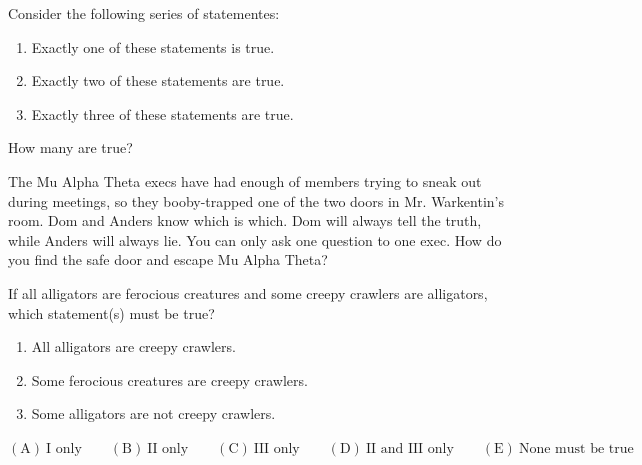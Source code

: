 \documentclass[12pt]{article}
\newenvironment{problem}[2][Problem]{\begin{trivlist}
\item[\hskip \labelsep {\bfseries #1}\hskip \labelsep {\bfseries #2.}]}{\end{trivlist}}
\begin{document}
\begin{problem}{4}
Consider the following series of statementes:
\begin{enumerate}[label=\Roman*.]
  \item Exactly one of these statements is true.
  \item Exactly two of these statements are true.
  \item Exactly three of these statements are true.
\end{enumerate}
How many are true?
\end{problem}
\begin{problem}{5}
The Mu Alpha Theta execs have had enough of members trying to sneak out during meetings, so they booby-trapped one of the two doors in Mr. Warkentin's room. Dom and Anders know which is which. Dom will always tell the truth, while Anders will always lie. You can only ask one question to one exec. How do you find the safe door and escape Mu Alpha Theta?
\end{problem}
\begin{problem}{6}
If all alligators are ferocious creatures and some creepy crawlers are alligators, which statement(s) must be true?
\begin{enumerate}[label=\Roman*.]
  \item All alligators are creepy crawlers.
  \item Some ferocious creatures are creepy crawlers.
  \item Some alligators are not creepy crawlers.
\end{enumerate}
$\mathrm{(A)}\ \text{I only} \qquad\mathrm{(B)}\ \text{II only} \qquad\mathrm{(C)}\ \text{III only} \qquad\mathrm{(D)}\ \text{II and III only} \qquad\mathrm{(E)}\ \text{None must be true}$
\end{problem}
\end{document}
